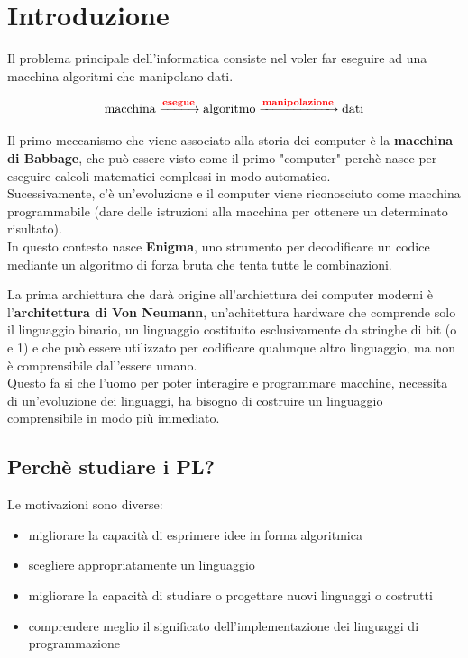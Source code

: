 
\chapter{Introduzione}
Il problema principale dell'informatica consiste nel voler far eseguire ad una macchina algoritmi che manipolano dati.

\[
    \text{macchina} \xrightarrow{\textcolor{red}{\textbf{esegue}}} \text{algoritmo} \xrightarrow{\textcolor{red}{\textbf{manipolazione}}} \text{dati}
\]

Il primo meccanismo che viene associato alla storia dei computer è la \textbf{macchina di Babbage}, che può essere visto come il primo "computer" perchè nasce per eseguire calcoli matematici complessi in modo automatico.\\[0.2ex]
Sucessivamente, c'è un'evoluzione e il computer viene riconosciuto come macchina programmabile (dare delle istruzioni alla macchina per ottenere un determinato risultato).\\[0.2ex]
In questo contesto nasce \textbf{Enigma}, uno strumento per decodificare un codice mediante un algoritmo di forza bruta che tenta tutte le combinazioni.

La prima archiettura che darà origine all'archiettura dei computer moderni è l'\textcolor{colore}{\textbf{architettura di Von Neumann}}, un'achitettura hardware che comprende solo il linguaggio binario, un linguaggio costituito esclusivamente da stringhe di bit (o e 1) e che può essere utilizzato per codificare qualunque altro linguaggio, ma non è comprensibile dall'essere umano.\\[0.2ex]
Questo fa si che l'uomo per poter interagire e programmare macchine, necessita di un'evoluzione dei linguaggi, ha bisogno di costruire un linguaggio comprensibile in modo più immediato.

\section{Perchè studiare i PL?}
Le motivazioni sono diverse:
\begin{itemize}[label=$\triangleright$, itemsep=\smallskipamount]
    \item migliorare la capacità di esprimere idee in forma algoritmica
    \item scegliere appropriatamente un linguaggio
    \item migliorare la capacità di studiare o progettare nuovi linguaggi o costrutti
    \item comprendere meglio il significato dell'implementazione dei linguaggi di programmazione
\end{itemize}

